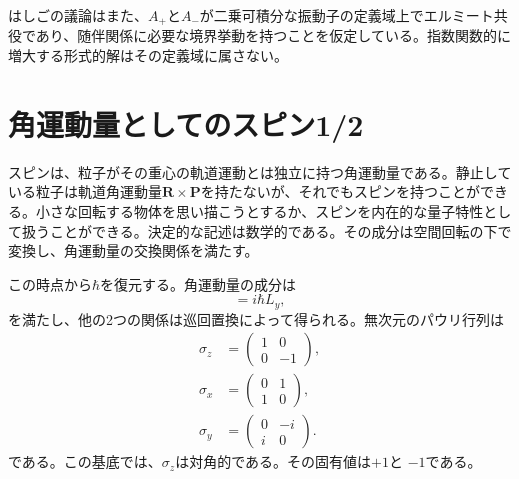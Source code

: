 はしごの議論はまた、\(A_{+}\)と\(A_{-}\)が二乗可積分な振動子の定義域上でエルミート共役であり、随伴関係に必要な境界挙動を持つことを仮定している。指数関数的に増大する形式的解はその定義域に属さない。

\begin{classroomqa}
\end{classroomqa}

\section{角運動量としてのスピン1/2}

スピンは、粒子がその重心の軌道運動とは独立に持つ角運動量である。静止している粒子は軌道角運動量\(\mathbf R\times\mathbf P\)を持たないが、それでもスピンを持つことができる。小さな回転する物体を思い描こうとするか、スピンを内在的な量子特性として扱うことができる。決定的な記述は数学的である。その成分は空間回転の下で変換し、角運動量の交換関係を満たす。

この時点から\(\hbar\)を復元する。角運動量の成分は
\begin{equation}
[L_{z},L_{x}]=i\hbar L_{y},
\end{equation}
を満たし、他の2つの関係は巡回置換によって得られる。無次元のパウリ行列は
\begin{equation}
\begin{aligned}
\sigma_{z}&=
\begin{pmatrix}
1&0\\
0&-1
\end{pmatrix},\\[0.4em]
\sigma_{x}&=
\begin{pmatrix}
0&1\\
1&0
\end{pmatrix},\\[0.4em]
\sigma_{y}&=
\begin{pmatrix}
0&-i\\
i&0
\end{pmatrix}.
\end{aligned}
\end{equation}
である。この基底では、\(\sigma_{z}\)は対角的である。その固有値は\(+1\)と
\(-1\)である。

\begin{classroomqa}
\end{classroomqa}

